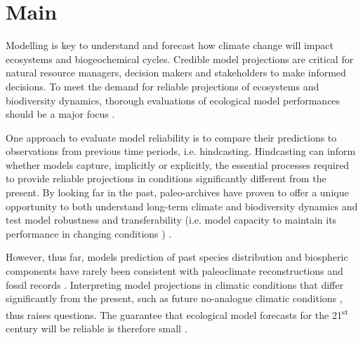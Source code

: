 \documentclass[pdflatex, sn-nature]{sn-jnl}%
\begin{document}
\newpage




\linenumbers
\section{Main}

Modelling is key to understand and forecast how climate change will impact ecosystems and biogeochemical cycles. Credible model projections are critical for natural resource managers, decision makers and stakeholders to make informed decisions. To meet the demand for reliable projections of ecosystems and biodiversity dynamics, thorough evaluations of ecological model performances should be a major focus \cite{Dawson2011, Mouquet2015, Pacifici2015}. 

One approach to evaluate model reliability is to compare their predictions to observations from previous time periods, i.e. hindcasting. Hindcasting can inform whether models capture, implicitly or explicitly, the essential processes required to provide reliable projections in conditions significantly different from the present. By looking far in the past, paleo-archives have proven to offer a unique opportunity to both understand long-term climate and biodiversity dynamics \cite{Bartlein2011, Fordham2020} and test model robustness and transferability (i.e. model capacity to maintain its performance in changing conditions \cite{UribeRivera2023}) \cite{Braconnot2012, Maguire2015}.  

However, thus far, models prediction of past species distribution and biospheric components have rarely been consistent with paleoclimate reconstructions and fossil records \cite{Veloz2012, Pearman2008, Roberts2012, Foley2013, Maguire2016} . Interpreting model projections in climatic conditions that differ significantly from the present, such as future no-analogue climatic conditions \cite{Williams2007}, thus raises questions. The guarantee that ecological model forecasts for the 21\textsuperscript{st} century will be reliable is therefore small \cite{Fitzpatrick2018}. 
\end{document}
